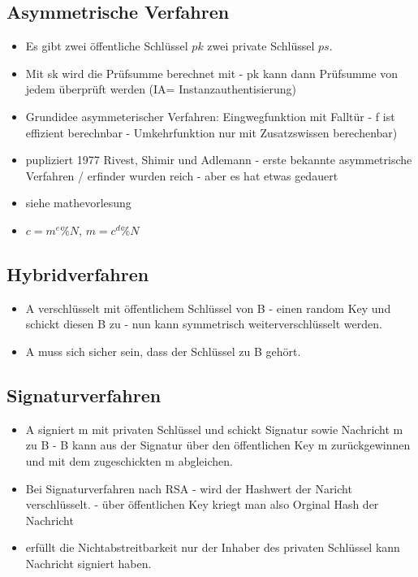 \documentclass[a4paper,10pt]{scrartcl}
\begin{document}
       \subsection{ Asymmetrische Verfahren} 
       \begin{itemize}
        \item Es gibt zwei öffentliche Schlüssel $pk$ zwei private Schlüssel $ps$.
        \item Mit sk wird die Prüfsumme berechnet mit - pk kann dann Prüfsumme von jedem überprüft werden (IA= Instanzauthentisierung)
        \item Grundidee asymmeterischer Verfahren: Eingwegfunktion mit Falltür - f ist effizient berechnbar - Umkehrfunktion nur mit Zusatzswissen berechenbar)
        \item pupliziert 1977 Rivest, Shimir und Adlemann - erste bekannte asymmetrische Verfahren / erfinder wurden reich - aber es hat etwas gedauert
        \item siehe mathevorlesung
        \item $c = m^e \% N$, $m = c^d \% N$ 
       \end{itemize}
       \subsection{ Hybridverfahren}
       \begin{itemize}
        \item A verschlüsselt mit öffentlichem Schlüssel von B - einen random Key und schickt diesen B zu - nun kann symmetrisch weiterverschlüsselt werden.
        \item A muss sich sicher sein, dass der Schlüssel zu B gehört.
       \end{itemize}
        \subsection{ Signaturverfahren}
       \begin{itemize}
        \item A signiert m mit privaten Schlüssel und schickt Signatur sowie Nachricht m zu B - B kann aus der Signatur über den öffentlichen Key m zurückgewinnen und mit dem 
        zugeschickten m abgleichen.
        \item Bei Signaturverfahren nach RSA - wird der Hashwert der Naricht verschlüsselt. - über öffentlichen Key kriegt man also Orginal Hash der Nachricht
        \item erfüllt die Nichtabstreitbarkeit nur der Inhaber des privaten Schlüssel kann Nachricht signiert haben.
       \end{itemize}
\end{document}
